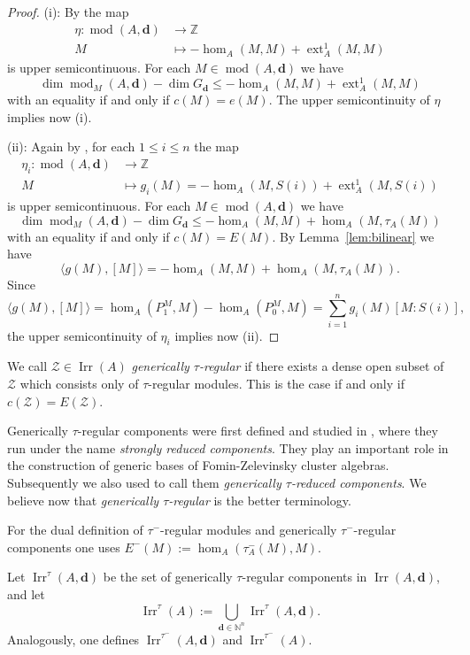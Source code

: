 \documentclass[12pt,reqno]{amsart}
\theoremstyle{definition}
\newcommand{\Z}{\mathbb{Z}}
\newcommand{\N}{\mathbb{N}}
\newcommand{\df}{\colon}
\newcommand{\bd}{\mathbf{d}}
\newcommand{\md}{\operatorname{mod}}
\newcommand{\ext}{\operatorname{ext}}
\newcommand{\bil}[1]{\langle #1\rangle}
\newcommand{\irr}{\operatorname{Irr}}
\newcommand{\calZ}{\mathcal{Z}}
\begin{document}
\begin{proof}
(i):
By \cite[Theorem~1.1]{GLFS23}
the map
\begin{align*}
\eta\df \md(A,\bd) &\to \Z
\\
M &\mapsto - \hom_A(M,M) + \ext_A^1(M,M)
\end{align*}
is upper semicontinuous.
For each $M \in \md(A,\bd)$ we have
$$
\dim \md_M(A,\bd) - \dim G_\bd \le
- \hom_A(M,M) + \ext_A^1(M,M)
$$
with an equality if and only if $c(M) = e(M)$.
The upper semicontinuity of $\eta$ implies now (i).

(ii):
Again
by \cite[Theorem~1.1]{GLFS23}, for each $1 \le i \le n$
the map
\begin{align*}
\eta_i\df \md(A,\bd) &\to \Z
\\
M &\mapsto g_i(M) = -\hom_A(M,S(i)) + \ext_A^1(M,S(i))
\end{align*}
is upper semicontinuous.
For each $M \in \md(A,\bd)$ we have
$$
\dim \md_M(A,\bd) - \dim G_\bd \le
- \hom_A(M,M) + \hom_A(M,\tau_A(M))
$$
with an equality if and only if $c(M) = E(M)$.
By Lemma~\ref{lem:bilinear} we have
$$
\bil{g(M),[M]} = - \hom_A(M,M) + \hom_A(M,\tau_A(M)).
$$
Since
$$
\bil{g(M),[M]} = \hom_A(P_1^M,M) - \hom_A(P_0^M,M)
= \sum_{i=1}^n g_i(M) [M:S(i)],
$$
the upper semicontinuity of $\eta_i$ implies now (ii).
\end{proof}


We call $\calZ \in \irr(A)$ \emph{generically $\tau$-regular} if
there exists a dense open subset of $\calZ$ which consists
only of $\tau$-regular modules.
This is the case if and only if
$c(\calZ) = E(\calZ)$.

Generically $\tau$-regular components were first defined and studied in \cite{GLS12},
where they run under the name \emph{strongly reduced
components}.
They play an important role in the construction of
generic bases of Fomin-Zelevinsky cluster algebras.
Subsequently we also used to call them \emph{generically $\tau$-reduced components}.
We believe now that \emph{generically $\tau$-regular} is
the better terminology.

For the dual definition of $\tau^-$-regular modules and
generically $\tau^-$-regular components one uses
$E^-(M) := \hom_A(\tau_A^-(M),M)$.

Let $\irr^\tau(A,\bd)$ be the set
of generically $\tau$-regular components
in $\irr(A,\bd)$, and let
$$
\irr^\tau(A) := \bigcup_{\bd \in \N^n} \irr^\tau(A,\bd).
$$
Analogously, one defines $\irr^{\tau^-}(A,\bd)$ and
$\irr^{\tau^-}(A)$.


\end{document}
